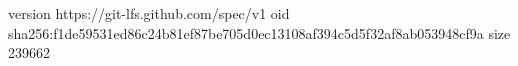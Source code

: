 version https://git-lfs.github.com/spec/v1
oid sha256:f1de59531ed86c24b81ef87be705d0ec13108af394c5d5f32af8ab053948cf9a
size 239662
